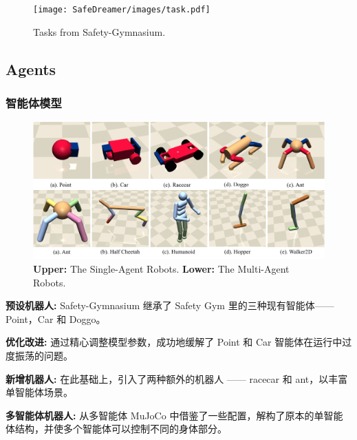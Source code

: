 \documentclass[10pt,mathserif]{beamer}%
\begin{document}
\begin{frame}[t, fragile]
\begin{minipage}[bp]{\textwidth}
\begin{figure}
  \centering
  \texttt{[image: SafeDreamer/images/task.pdf]}
  \vspace*{-0.8\baselineskip}
  \caption{Tasks from Safety-Gymnasium.}
  \label{fig:task}
\end{figure}

\end{minipage}

\end{frame}
\subsection{Agents}
\begin{frame}[t,fragile]
    \frametitle{智能体模型}
\begin{figure}[ht]
  \centering
  \includegraphics[width=0.9\linewidth]{Safety-Gymnasium/assets/main-paper/agent.pdf}
  \vspace*{-0.5\baselineskip}
  \caption{\textbf{Upper: }The Single-Agent Robots. \textbf{Lower:} The Multi-Agent Robots.}
  \label{pic:agent}
\end{figure}
\vspace{-0.5cm}
\begin{itemize}
{
\fontsize{8pt}{9.6pt}\selectfont
    \item \textbf{预设机器人:} Safety-Gymnasium 继承了 Safety Gym 里的三种现有智能体——Point，Car 和 Doggo。
    \item \textbf{优化改进:} 通过精心调整模型参数，成功地缓解了 Point 和 Car 智能体在运行中过度振荡的问题。
    \item \textbf{新增机器人:} 在此基础上，引入了两种额外的机器人 —— racecar 和 ant，以丰富单智能体场景。
    \item \textbf{多智能体机器人:} 从多智能体 MuJoCo 中借鉴了一些配置，解构了原本的单智能体结构，并使多个智能体可以控制不同的身体部分。
}
\end{itemize}
\end{frame}
\end{document}
